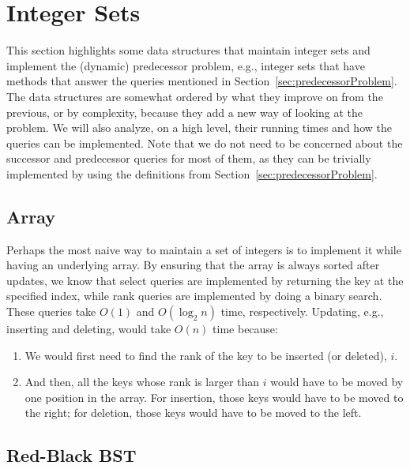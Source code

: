 \newpage
\section{Integer Sets} \label{sec:IntegerSets}

This section highlights some data structures that maintain integer sets and implement the (dynamic) predecessor problem, e.g., integer sets that have methods that answer the queries mentioned in Section~\ref{sec:predecessorProblem}.
The data structures are somewhat ordered by what they improve on from the previous, or by complexity, because they add a new way of looking at the problem.
We will also analyze, on a high level, their running times and how the queries can be implemented.
Note that we do not need to be concerned about the successor and predecessor queries for most of them, as they can be trivially implemented by using the definitions from Section~\ref{sec:predecessorProblem}.

\subsection{Array}

Perhaps the most naive way to maintain a set of integers is to implement it while having an underlying array. By ensuring that the array is always sorted after updates, we know that select queries are implemented by returning the key at the specified index, while rank queries are implemented by doing a binary search. These queries take $O(1)$ and $O(\log_2 n)$ time, respectively. Updating, e.g., inserting and deleting, would take $O(n)$ time because:
\begin{enumerate}
    \item
    We would first need to find the rank of the key to be inserted (or deleted), $i$.
    
    \item
    And then, all the keys whose rank is larger than $i$ would have to be moved by one position in the array. For insertion, those keys would have to be moved to the right; for deletion, those keys would have to be moved to the left.
\end{enumerate}

\subsection{Red-Black BST}

